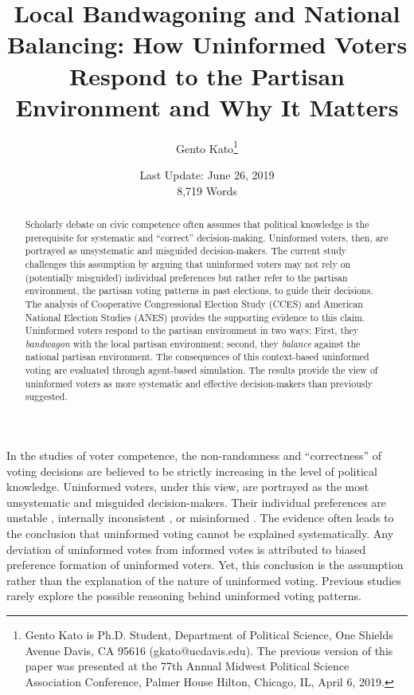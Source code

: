\documentclass[letterpaper, 12pt]{article}
\title{Local Bandwagoning and National Balancing: How Uninformed Voters Respond to the Partisan Environment and Why It Matters} %
\author{Gento Kato\thanks{Gento Kato is Ph.D. Student, Department of Political Science, One Shields Avenue Davis, CA 95616 (gkato@ucdavis.edu). The previous version of this paper was presented at the 77th Annual Midwest Political Science Association Conference, Palmer House Hilton, Chicago, IL, April 6, 2019.}}
\affil{University of California, Davis}
\date{Last Update: June 26, 2019\\8,719 Words}
\begin{document}
\begin{titlepage}
    
    \singlespace
    \maketitle
    \thispagestyle{empty}
    
    
    \begin{abstract}
        Scholarly debate on civic competence often assumes that political knowledge is the prerequisite for systematic and ``correct'' decision-making. Uninformed voters, then, are portrayed as unsystematic and misguided decision-makers. The current study challenges this assumption by arguing that uninformed voters may not rely on (potentially misguided) individual preferences but rather refer to the partisan environment, the partisan voting patterns in past elections, to guide their decisions. The analysis of Cooperative Congressional Election Study (CCES) and American National Election Studies (ANES) provides the supporting evidence to this claim. Uninformed voters respond to the partisan environment in two ways: First, they \textit{bandwagon} with the local partisan environment; second, they \textit{balance} against the national partisan environment. The consequences of this context-based uninformed voting are evaluated through agent-based simulation. The results provide the view of uninformed voters as more systematic and effective decision-makers than previously suggested.
    \end{abstract}
    \end{titlepage}
    
    \clearpage
    \doublespace

    \par In the studies of voter competence, the non-randomness and ``correctness'' of voting decisions are believed to be strictly increasing in the level of political knowledge. Uninformed voters, under this view, are portrayed as the most unsystematic and misguided decision-makers. Their individual preferences are unstable \citep{Converse1964thna, Zaller1992thna}, internally inconsistent \citep{Broockman2016apto}, or misinformed \citep{Kuklinski2000mian, Fowler2014thpo}. The evidence often leads to the conclusion that uninformed voting cannot be explained systematically. Any deviation of uninformed votes from informed votes \citep{Bartels1996unvo} is attributed to biased preference formation of uninformed voters. Yet, this conclusion is the assumption rather than the explanation of the nature of uninformed voting. Previous studies rarely explore the possible reasoning behind uninformed voting patterns.
    
\end{document}
